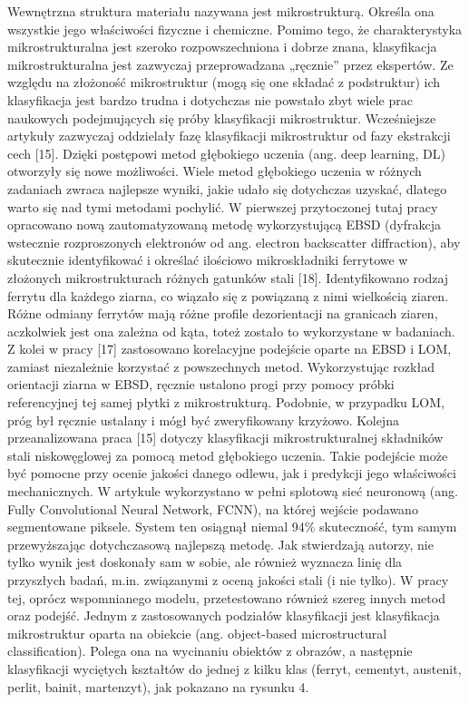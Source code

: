 Wewnętrzna struktura materiału nazywana jest mikrostrukturą. Określa ona wszystkie jego właściwości fizyczne i chemiczne. Pomimo tego, że charakterystyka mikrostrukturalna jest szeroko rozpowszechniona i dobrze znana, klasyfikacja mikrostrukturalna jest zazwyczaj przeprowadzana „ręcznie” przez ekspertów. Ze względu na złożoność mikrostruktur (mogą się one składać z podstruktur) ich klasyfikacja jest bardzo trudna i dotychczas nie powstało zbyt wiele prac naukowych podejmujących się próby klasyfikacji mikrostruktur. Wcześniejsze artykuły zazwyczaj oddzielały fazę klasyfikacji mikrostruktur od fazy ekstrakcji cech [15]. Dzięki postępowi metod głębokiego uczenia (ang. deep learning, DL) otworzyły się nowe możliwości. Wiele metod głębokiego uczenia w różnych zadaniach zwraca najlepsze wyniki, jakie udało się dotychczas uzyskać, dlatego warto się nad tymi metodami pochylić. 
W pierwszej przytoczonej tutaj pracy opracowano nową zautomatyzowaną metodę wykorzystującą EBSD (dyfrakcja wstecznie rozproszonych elektronów od ang. electron backscatter diffraction), aby skutecznie identyfikować i określać ilościowo mikroskładniki ferrytowe w złożonych mikrostrukturach różnych gatunków stali [18]. Identyfikowano rodzaj ferrytu dla każdego ziarna, co wiązało się z powiązaną z nimi wielkością ziaren. Różne odmiany ferrytów mają różne profile dezorientacji na granicach ziaren, aczkolwiek jest ona zależna od kąta, toteż zostało to wykorzystane w badaniach.
    Z kolei w pracy [17] zastosowano korelacyjne podejście oparte na EBSD i LOM, zamiast niezależnie korzystać z powszechnych metod. Wykorzystując rozkład orientacji ziarna w EBSD, ręcznie ustalono progi przy pomocy próbki referencyjnej tej samej płytki z mikrostrukturą. Podobnie, w przypadku LOM, próg był ręcznie ustalany i mógł być zweryfikowany krzyżowo.
Kolejna przeanalizowana praca [15] dotyczy klasyfikacji mikrostrukturalnej składników stali niskowęglowej za pomocą metod głębokiego uczenia. Takie podejście może być pomocne przy ocenie jakości danego odlewu, jak i predykcji jego właściwości mechanicznych. W artykule wykorzystano w pełni splotową sieć neuronową (ang. Fully Convolutional Neural Network, FCNN), na której wejście podawano segmentowane piksele. System ten osiągnął niemal 94\% skuteczność, tym samym przewyższając dotychczasową najlepszą metodę. Jak stwierdzają autorzy, nie tylko wynik jest doskonały sam w sobie, ale również wyznacza linię dla przyszłych badań, m.in. związanymi z oceną jakości stali (i nie tylko). W pracy tej, oprócz wspomnianego modelu, przetestowano również szereg innych metod oraz podejść. Jednym z zastosowanych podziałów klasyfikacji jest klasyfikacja mikrostruktur oparta na obiekcie (ang. object-based microstructural classification). Polega ona na wycinaniu obiektów z obrazów, a następnie klasyfikacji wyciętych kształtów do jednej z kilku klas (ferryt, cementyt, austenit, perlit, bainit, martenzyt), jak pokazano na rysunku 4.  

